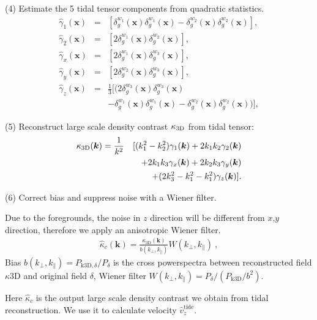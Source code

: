 (4) Estimate the 5 tidal tensor components from quadratic statistics.
\begin{eqnarray}
\label{eq:gamma}
\hat{\gamma}_1(\bm{x})&=&
[{\delta}^{w_1}_g(\bm{x}){\delta}^{w_1}_g(\bm{x})-
{\delta}^{w_2}_g(\bm{x}){\delta}^{w_2}_g(\bm{x})],\nonumber\\
\hat{\gamma}_2(\bm{x})&=&
[2{\delta}^{w_1}_g(\bm{x}){\delta}^{w_2}_g(\bm{x})],\nonumber\\
\hat{\gamma}_x(\bm{x})&=&
[2{\delta}^{w_1}_g(\bm{x}){\delta}^{w_3}_g(\bm{x})],\\
\hat{\gamma}_y(\bm{x})&=&
[2{\delta}^{w_2}_g(\bm{x}){\delta}^{w_3}_g(\bm{x})],\nonumber\\
\hat{\gamma}_z(\bm{x})&=&
\frac{1}{3}[(2{\delta}^{w_3}_g(\bm{x}){\delta}^{w_3}_g(\bm{x})\nonumber\\
&&-{\delta}^{w_1}_g(\bm{x}){\delta}^{w_1}_g(\bm{x})
-{\delta}^{w_2}_g(\bm{x}){\delta}^{w_2}_g(\bm{x}))],\nonumber
\end{eqnarray}

(5) Reconstruct large scale density contrast $\kappa_\mathrm{3D}$ from tidal tensor:
\begin{eqnarray}
\kappa_\mathrm{3D}(\bm{k})=\frac{1}{k^2}
&&[(k_1^2-k_2^2)\gamma_1(\bm{k})+2k_1k_2\gamma_2(\bm{k})\nonumber\\
&&+2k_1k_3\gamma_x(\bm{k})+2k_2k_3\gamma_y(\bm{k})\\\nonumber
&&+(2k_3^2-k_1^2-k_1^2)\gamma_z(\bm{k})].
\end{eqnarray}

(6) Correct bias and suppress noise with a Wiener filter.

Due to the foregrounds, the noise in $z$ direction will be different from $x$,$y$ direction, therefore we apply an anisotropic Wiener filter.
\begin{eqnarray}
	\label{eq:wiener}
    \hat \kappa_{c}(\bm{k})=\frac{\kappa_{\mathrm{3D}}(\bm{k})}{b(k_\perp,k_\parallel)}W(k_\perp,k_\parallel)\ ,
\end{eqnarray}
Bias $b(k_\perp,k_\parallel)=P_{\mathrm{k3D,}\delta}/P_\delta$ 
is the cross powerspectra between reconstructed field $\kappa\mathrm{3D}$ and original field $\delta$, 
Wiener filter $W(k_\perp,k_\parallel)=P_\delta/(P_{\mathrm{k3D}}/b^2)$.

Here $\hat \kappa_{c}$ is the output large scale density contrast we obtain from tidal reconstruction.
We use it to calculate velocity $\hat v_z^{\mathrm{tide}}$.

